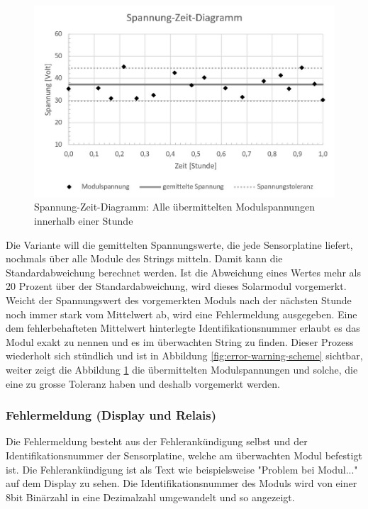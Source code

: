 \begin{figure}[htbp] 
  \centering
     \includegraphics[width=1\textwidth]{graphics/failurecalc-diagram}
  \caption{Spannung-Zeit-Diagramm: Alle übermittelten Modulspannungen innerhalb einer Stunde}
  \label{fig:failurecalc-diagram}
\end{figure}

Die Variante will die gemittelten Spannungswerte, die jede Sensorplatine liefert, nochmals über alle Module des Strings mitteln. Damit kann die Standardabweichung berechnet werden. Ist die Abweichung eines Wertes mehr als 20 Prozent über der Standardabweichung, wird dieses Solarmodul vorgemerkt. Weicht der Spannungswert des vorgemerkten Moduls nach der nächsten Stunde noch immer stark vom Mittelwert ab, wird eine Fehlermeldung ausgegeben. Eine dem fehlerbehafteten Mittelwert hinterlegte Identifikationsnummer erlaubt es das Modul exakt zu nennen und es im überwachten String zu finden. Dieser Prozess wiederholt sich stündlich und ist in Abbildung \ref{fig:error-warning-scheme} sichtbar, weiter zeigt die Abbildung \ref{fig:failurecalc-diagram} die übermittelten Modulspannungen und solche, die eine zu grosse Toleranz haben und deshalb vorgemerkt werden.

\subsubsection{Fehlermeldung (Display und Relais)}
Die Fehlermeldung besteht aus der Fehlerankündigung selbst und der Identifikationsnummer der Sensorplatine, welche am überwachten Modul befestigt ist. Die Fehlerankündigung ist als Text wie beispielsweise "Problem bei Modul..." auf dem Display zu sehen. Die Identifikationsnummer des Moduls wird von einer 8bit Binärzahl in eine Dezimalzahl umgewandelt und so angezeigt.

